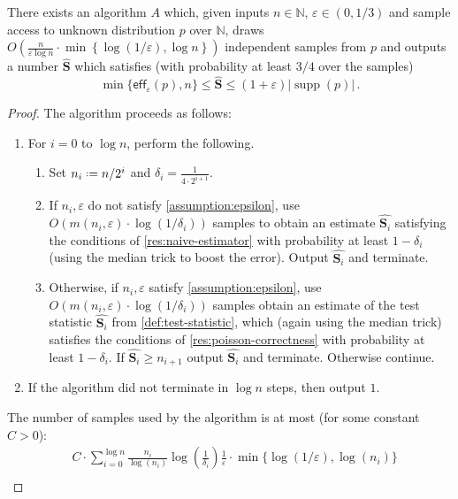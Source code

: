\documentclass{theoretics}
\DeclareMathOperator{\supp}{supp}   %
\newcommand*{\define}{\mathrel{\vcenter{\baselineskip0.5ex \lineskiplimit0pt
                      \hbox{\scriptsize.}\hbox{\scriptsize.}}}%
                      =}
\newcommand{\bN}{\ensuremath{\mathbb{N}}}
\newcommand{\eff}{\mathsf{eff}}
\renewcommand{\epsilon}{\varepsilon}
\begin{document}
\begin{corollary}
    There exists an algorithm $A$ which, given inputs $n \in \bN$, $\epsilon \in (0,1/3)$ and sample
    access to unknown distribution $p$ over $\bN$, draws $O\left(\frac{n}{\epsilon \log n} \cdot
    \min\left\{ \log(1/\epsilon), \log n \right\} \right)$ independent samples from $p$ and outputs
    a number $\widehat{\bm S}$ which satisfies (with probability at least $3/4$ over the samples)
\[
  \min\{ \eff_\epsilon(p), n\} \leq \widehat{\bm{S}} \leq (1+\epsilon)|\supp(p)| \,.
\]
\end{corollary}
\begin{proof}
The algorithm proceeds as follows:
\begin{enumerate}
\item For $i=0$ to $\log n$, perform the following.
\begin{enumerate}
\item Set $n_i \define n/2^i$ and $\delta_i = \tfrac{1}{4 \cdot 2^{i+1}}$.
\item If $n_i, \epsilon$ do not satisfy \cref{assumption:epsilon}, use $O(m(n_i, \epsilon) \cdot
    \log(1/\delta_i))$ samples to obtain an estimate $\widehat{\bm{S}_i}$ satisfying the conditions
    of \cref{res:naive-estimator} with probability at least $1-\delta_i$ (using the median trick to
    boost the error). Output $\widehat{\bm{S}_i}$ and terminate.
\item Otherwise, if $n_i, \epsilon$ satisfy \cref{assumption:epsilon}, use $O(m(n_i, \epsilon) \cdot
    \log(1/\delta_i))$ samples obtain an estimate of the test statistic $\widehat{\bm{S}_i}$ from
    \cref{def:test-statistic}, which (again using the median trick) satisfies the conditions of
    \cref{res:poisson-correctness} with probability at least $1-\delta_i$. If $\widehat{\bm{S}_i}
    \geq n_{i+1}$ output $\widehat{\bm{S}_i}$ and terminate. Otherwise continue.
\end{enumerate}
\item If the algorithm did not terminate in $\log n$ steps, then output $1$.
\end{enumerate}
The number of samples used by the algorithm is at most (for some constant $C > 0$):
\begin{align*}
&C \cdot \sum_{i=0}^{\log n} \frac{n_i}{\log(n_i)} \log\left(\frac{1}{\delta_i}\right)
\frac{1}{\epsilon} \cdot \min\{ \log(1/\epsilon), \log(n_i) \} \\

\end{align*}
\end{proof}
\end{document}
